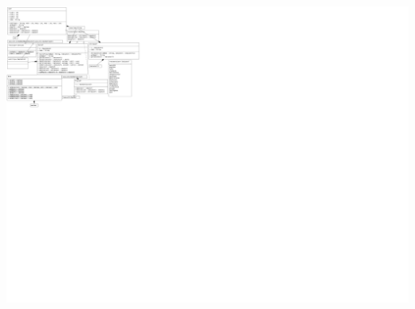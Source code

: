 \documentclass[12pt]{article}
\begin{document}
\includegraphics[width=50cm, height=50cm]{UML_final.png}
\end{document}
